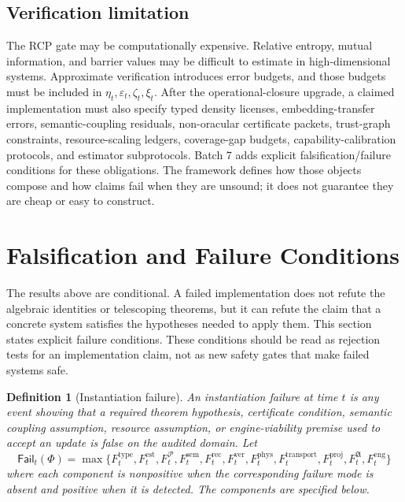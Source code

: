 \documentclass[11pt]{article}
\newtheorem{definition}[theorem]{Definition}
\newcommand{\Pcal}{\mathcal{P}}
\newcommand{\1}{\mathbf{1}}
\newcommand{\eps}{\varepsilon}
\providecommand{\sem}{\mathrm{sem}}
\providecommand{\phys}{\mathrm{phys}}
\providecommand{\ver}{\mathrm{ver}}
\begin{document}
\subsection{Verification limitation}

The RCP gate may be computationally expensive. Relative entropy, mutual information, and barrier values may be difficult to estimate in high-dimensional systems. Approximate verification introduces error budgets, and those budgets must be included in \(\eta_t,\eps_t,\zeta_t,\xi_t\).  After the operational-closure upgrade, a claimed implementation must also specify typed density licenses, embedding-transfer errors, semantic-coupling residuals, non-oracular certificate packets, trust-graph constraints, resource-scaling ledgers, coverage-gap budgets, capability-calibration protocols, and estimator subprotocols.  Batch 7 adds explicit falsification/failure conditions for these obligations. The framework defines how those objects compose and how claims fail when they are unsound; it does not guarantee they are cheap or easy to construct.


\section{Falsification and Failure Conditions}
\label{sec:falsification_failure_conditions}

The results above are conditional. A failed implementation does not refute the algebraic identities or telescoping theorems, but it can refute the claim that a concrete system satisfies the hypotheses needed to apply them. This section states explicit failure conditions. These conditions should be read as rejection tests for an implementation claim, not as new safety gates that make failed systems safe.

\begin{definition}[Instantiation failure]
An instantiation failure at time \(t\) is any event showing that a required theorem hypothesis, certificate condition, semantic coupling assumption, resource assumption, or engine-viability premise used to accept an update is false on the audited domain. Let
\[
\mathsf{Fail}_t(\Phi)=
\max\{F_t^{\mathrm{type}},F_t^{\mathrm{est}},F_t^{\Pcal},F_t^{\sem},F_t^{\mathrm{rec}},F_t^{\ver},F_t^{\phys},F_t^{\mathrm{transport}},F_t^{\mathrm{proj}},F_t^{\mathfrak A},F_t^{\mathrm{eng}}\}
\]
where each component is nonpositive when the corresponding failure mode is absent and positive when it is detected. The components are specified below.
\end{definition}
\end{document}
